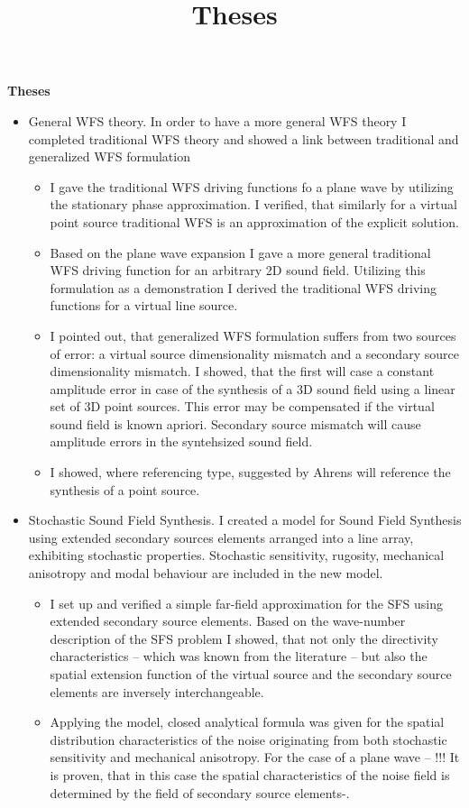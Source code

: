 \documentclass[a4paper,10pt]{article}
\title{Theses}
\date{}
\begin{document}
\begin{center}
  \textbf{\Large Theses}\\[0.5cm]
\end{center}

\begin{itemize}
\item General WFS theory. In order to have a more general WFS theory I completed traditional WFS theory and showed a link between traditional and generalized WFS formulation
\begin{itemize}
\item I gave the traditional WFS driving functions fo a plane wave by utilizing the stationary phase approximation. I verified, that similarly for a virtual point source traditional WFS is an approximation of the explicit solution. 
\item Based on the plane wave expansion I gave a more general traditional WFS driving function for an arbitrary 2D sound field. Utilizing this formulation as a demonstration I derived the traditional WFS driving functions for a virtual line source.
\item I pointed out, that generalized WFS formulation suffers from two sources of error: a virtual source dimensionality mismatch
and a secondary source dimensionality mismatch. I showed, that the first will case a constant amplitude error in case of the synthesis of a 3D sound field using a linear set of 3D point sources. This error may be compensated if the virtual sound field is known apriori. Secondary source mismatch will cause amplitude errors in the syntehsized sound field. 
\item I showed, where referencing type, suggested by Ahrens will reference the synthesis of a point source.
\end{itemize}

\item Stochastic Sound Field Synthesis. I created a model for Sound Field Synthesis using extended secondary sources elements arranged into a line array, exhibiting stochastic properties. Stochastic sensitivity, rugosity, mechanical anisotropy and modal behaviour are included in the new model.
	
	\begin{itemize}
	\item I set up and verified a simple far-field approximation for the SFS using extended secondary source elements. Based on the wave-number description of the SFS problem I showed, that not only the directivity characteristics -- which was known from the literature -- but also the spatial extension function of the virtual source and the secondary source elements are inversely interchangeable.
	\item Applying the model, closed analytical formula was given for the spatial distribution characteristics of the noise originating from both stochastic sensitivity and mechanical anisotropy. For the case of a plane wave -- !!! It is proven, that in this case the spatial characteristics of the noise field is determined by the field of secondary source 				elements-. 	
		

\end{itemize}
\end{itemize}
\end{document}

